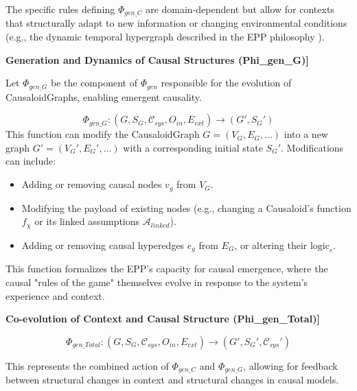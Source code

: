 The specific rules defining \(\Phi_{gen\_C}\) are domain-dependent but allow for contexts that structurally adapt to new information or changing environmental conditions (e.g., the dynamic temporal hypergraph described in the EPP philosophy \cite{Hansen2025EPP}).


\textbf{Generation and Dynamics of Causal Structures (Phi\_gen\_G)]}

        
Let \(\Phi_{gen\_G}\) be the component of \(\Phi_{gen}\) responsible for the evolution of CausaloidGraphs, enabling emergent causality.

\begin{definition}
\label{def:epp_gen_function_causal}  
        \[ \Phi_{gen\_G} : (G, S_G, \mathcal{C}_{sys}, O_{in}, E_{ext}) \to (G', S_G') \]
        This function can modify the CausaloidGraph \(G=(V_G, E_G, \dots)\) into a new graph \(G'=(V_G', E_G', \dots)\) with a corresponding initial state \(S_G'\). Modifications can include:
        \begin{itemize}
            \item Adding or removing causal nodes \(v_g\) from \(V_G\).
            \item Modifying the payload of existing nodes (e.g., changing a Causaloid's function \(f_\chi\) or its linked assumptions \(\mathcal{A}_{linked}\)).
            \item Adding or removing causal hyperedges \(e_g\) from \(E_G\), or altering their \(\text{logic}_e\).
        \end{itemize}
 \end{definition}   
 
This function formalizes the EPP's capacity for causal emergence, where the causal "rules of the game" themselves evolve in response to the system's experience and context.\newline

       
\textbf{Co-evolution of Context and Causal Structure (Phi\_gen\_Total)]}
                
\begin{definition}
\label{def:epp_gen_function_total}        
        \[ \Phi_{gen\_Total} : (G, S_G, \mathcal{C}_{sys}, O_{in}, E_{ext}) \to (G', S_G', \mathcal{C}_{sys}') \]
 \end{definition}   

This represents the combined action of \(\Phi_{gen\_C}\) and \(\Phi_{gen\_G}\), allowing for feedback between structural changes in context and structural changes in causal models.

